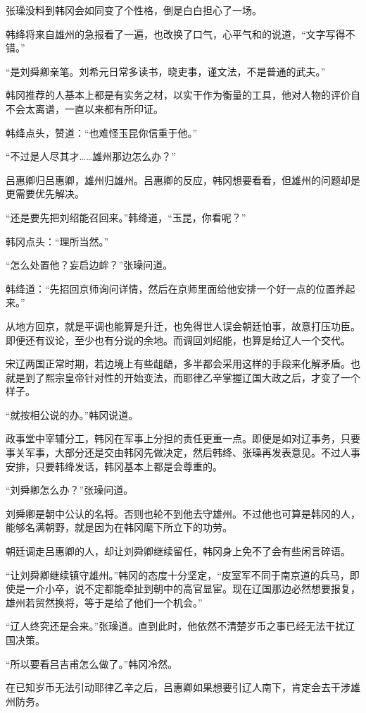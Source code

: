 张璪没料到韩冈会如同变了个性格，倒是白白担心了一场。

韩绛将来自雄州的急报看了一遍，也改换了口气，心平气和的说道，“文字写得不错。”

“是刘舜卿亲笔。刘希元日常多读书，晓吏事，谨文法，不是普通的武夫。”

韩冈推荐的人基本上都是有实务之材，以实干作为衡量的工具，他对人物的评价自不会太离谱，一直以来都有所印证。

韩绛点头，赞道：“也难怪玉昆你信重于他。”

“不过是人尽其才……雄州那边怎么办？”

吕惠卿归吕惠卿，雄州归雄州。吕惠卿的反应，韩冈想要看看，但雄州的问题却是更需要优先解决。

“还是要先把刘绍能召回来。”韩绛道，“玉昆，你看呢？”

韩冈点头：“理所当然。”

“怎么处置他？妄启边衅？”张璪问道。

韩绛道：“先招回京师询问详情，然后在京师里面给他安排一个好一点的位置养起来。”

从地方回京，就是平调也能算是升迁，也免得世人误会朝廷怕事，故意打压功臣。即便还有议论，至少也有分说的余地。而调回刘绍能，也算是给辽人一个交代。

宋辽两国正常时期，若边境上有些龃龉，多半都会采用这样的手段来化解矛盾。也就是到了熙宗皇帝针对性的开始变法，而耶律乙辛掌握辽国大政之后，才变了一个样子。

“就按相公说的办。”韩冈说道。

政事堂中宰辅分工，韩冈在军事上分担的责任更重一点。即便是如对辽事务，只要事关军事，大部分还是交由韩冈先做决定，然后韩绛、张璪再发表意见。不过人事安排，只要韩绛发话，韩冈基本上都是会尊重的。

“刘舜卿怎么办？”张璪问道。

刘舜卿是朝中公认的名将。否则也轮不到他去守雄州。不过他也可算是韩冈的人，能够名满朝野，就是因为在韩冈麾下所立下的功劳。

朝廷调走吕惠卿的人，却让刘舜卿继续留任，韩冈身上免不了会有些闲言碎语。

“让刘舜卿继续镇守雄州。”韩冈的态度十分坚定，“皮室军不同于南京道的兵马，即使是一介小卒，说不定都能牵扯到朝中的高官显宦。现在辽国那边必然想要报复，雄州若贸然换将，等于是给了他们一个机会。”

“辽人终究还是会来。”张璪道。直到此时，他依然不清楚岁币之事已经无法干扰辽国决策。

“所以要看吕吉甫怎么做了。”韩冈冷然。

在已知岁币无法引动耶律乙辛之后，吕惠卿如果想要引辽人南下，肯定会去干涉雄州防务。

